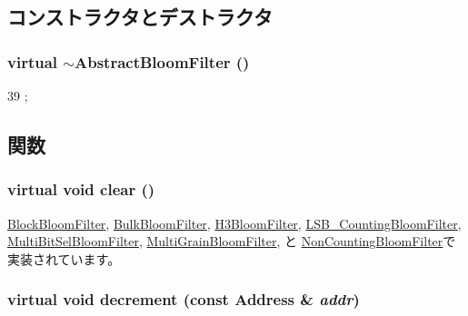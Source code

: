 \subsection{コンストラクタとデストラクタ}
\hypertarget{classAbstractBloomFilter_a750758d99727e6a06111be87c6b62cfa}{
\subsubsection[{$\sim$AbstractBloomFilter}]{\setlength{\rightskip}{0pt plus 5cm}virtual $\sim${\bf AbstractBloomFilter} ()}}
\label{classAbstractBloomFilter_a750758d99727e6a06111be87c6b62cfa}



\begin{DoxyCode}
39 {};
\end{DoxyCode}


\subsection{関数}
\hypertarget{classAbstractBloomFilter_a5eeb94d22b8366d1b68d0614384802fe}{
\subsubsection[{clear}]{\setlength{\rightskip}{0pt plus 5cm}virtual void clear ()}}
\label{classAbstractBloomFilter_a5eeb94d22b8366d1b68d0614384802fe}


\hyperlink{classBlockBloomFilter_ac8bb3912a3ce86b15842e79d0b421204}{BlockBloomFilter}, \hyperlink{classBulkBloomFilter_ac8bb3912a3ce86b15842e79d0b421204}{BulkBloomFilter}, \hyperlink{classH3BloomFilter_ac8bb3912a3ce86b15842e79d0b421204}{H3BloomFilter}, \hyperlink{classLSB__CountingBloomFilter_ac8bb3912a3ce86b15842e79d0b421204}{LSB\_\-CountingBloomFilter}, \hyperlink{classMultiBitSelBloomFilter_ac8bb3912a3ce86b15842e79d0b421204}{MultiBitSelBloomFilter}, \hyperlink{classMultiGrainBloomFilter_ac8bb3912a3ce86b15842e79d0b421204}{MultiGrainBloomFilter}, と \hyperlink{classNonCountingBloomFilter_ac8bb3912a3ce86b15842e79d0b421204}{NonCountingBloomFilter}で実装されています。\hypertarget{classAbstractBloomFilter_aa387151f4ab03c6cd497d4385e34c21a}{
\subsubsection[{decrement}]{\setlength{\rightskip}{0pt plus 5cm}virtual void decrement (const {\bf Address} \& {\em addr})}}
\label{classAbstractBloomFilter_aa387151f4ab03c6cd497d4385e34c21a}


